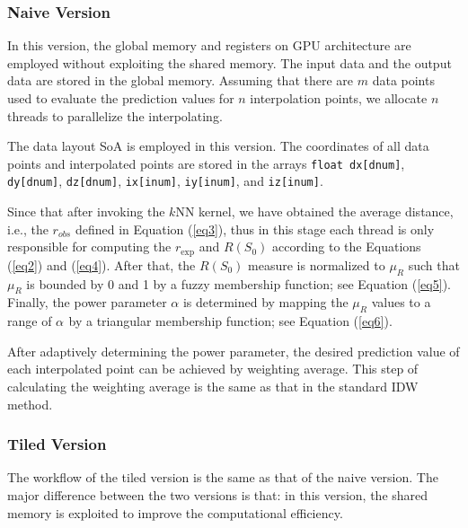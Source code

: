 \documentclass[final,5p,times,twocolumn,authoryear]{elsarticle}
\begin{document}
			\subsubsection{Naive Version}
			
			In this version, the global memory and registers on GPU architecture are 
			employed without exploiting the shared memory. The input data and the output 
			data are stored in the global memory. Assuming that there are $m$ data points 
			used to evaluate the prediction values for $n$ interpolation points, we 
			allocate $n$ threads to parallelize the interpolating. 
			
			The data layout SoA is employed in this version. The coordinates of all data 
			points and interpolated points are stored in the arrays \texttt{float dx[dnum]}, \texttt{dy[dnum]}, \texttt{dz[dnum]}, \texttt{ix[inum]}, \texttt{iy[inum]}, and \texttt{iz[inum]}. 
			
			Since that after invoking the $k$NN kernel, we have obtained the average 
			distance, i.e., the $r_{obs} $ defined in Equation (\ref{eq3}), thus in this stage 
			each thread is only responsible for computing the $r_{\exp } $ and $R\left( 
			{S_0 } \right)$ according to the Equations (\ref{eq2}) and (\ref{eq4}). After that, the 
			$R\left( {S_0 } \right)$ measure is normalized to $\mu _R $ such that $\mu 
			_R $ is bounded by 0 and 1 by a fuzzy membership function; see Equation (\ref{eq5}). 
			Finally, the power parameter $\alpha $ is determined by mapping the $\mu 
			_{R}$ values to a range of $\alpha _{ }$ by a triangular membership 
			function; see Equation (\ref{eq6}).
			
			After adaptively determining the power parameter, the desired prediction 
			value of each interpolated point can be achieved by weighting average. This 
			step of calculating the weighting average is the same as that in the 
			standard IDW method.
			
			\subsubsection{Tiled Version}
			
			The workflow of the tiled version is the same as that of the naive version. 
			The major difference between the two versions is that: in this version, the 
			shared memory is exploited to improve the computational efficiency. 
			
\end{document}
